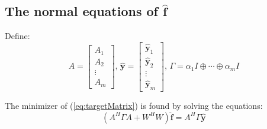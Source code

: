 \documentclass[12pt]{article}
\numberwithin{equation}{section}
\begin{document}
\subsection{The normal equations of $\hat{\bm{f}}$}
Define: 
\begin{equation}
	A = 
	\begin{bmatrix}
		A_1 \\ A_2 \\ \vdots \\ A_m
	\end{bmatrix}
	 \text{,   }
	\hat{\bm{y}}= 
	\begin{bmatrix}
		\hat{\bm{y}}_1 \\ \hat{\bm{y}}_2 \\ \vdots \\ \hat{\bm{y}}_m
	\end{bmatrix}
	 \text{,   }
	 \Gamma=\alpha_1 I  \oplus \cdots \oplus \alpha_m I
\end{equation}

The minimizer of (\ref{eq:targetMatrix}) is found by solving the equations:
\begin{equation} \label{eq:normal}
	(A^H \Gamma A + W^H W) \hat{\bm{f}} = A^H \Gamma \hat{\bm{y}}
\end{equation}
\end{document}
